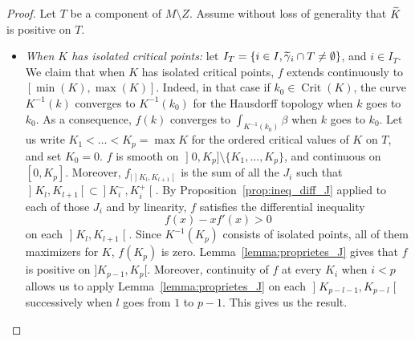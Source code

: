 \documentclass[10pt,a4paper]{amsart}
\DeclareMathOperator{\Crit}{Crit}
\let\oldtilde\tilde
\renewcommand*{\tilde}[1]{\mathchoice{\widetilde{#1}}{\widetilde{#1}}{\oldtilde{#1}}{\oldtilde{#1}}}
\theoremstyle{definition}\newtheorem{defi}[theo]{Definition}
\begin{document}
\begin{proof}
Let $T$ be a component of $M \setminus Z$. Assume without loss of generality that $\tilde K$ is positive on $T$.
\begin{itemize}
\item
\emph{When $K$ has isolated critical points: } let $I_T = \{i \in I, \tilde \gamma_i \cap T \neq \emptyset\}$, and $i \in I_T$. We claim that when $K$ has isolated critical points, $f$ extends continuously to $[\min(K), \max(K)]$. Indeed, in that case if $k_0 \in \Crit(K)$, the curve $K^{-1}(k)$ converges to $K^{-1}(k_0)$ for the Hausdorff topology when $k$ goes to $k_0$. As a consequence, $f(k)$ converges to $\int_{K^{-1}(k_0)} \beta$ when $k$ goes to $k_0$. Let us write $K_1 < \dots < K_p = \max K$ for the ordered critical values of $K$ on $T$, and set $K_0 = 0$. $f$ is smooth on $\mathopen{]}0, K_p] \setminus \{K_1, \ldots, K_p\}$, and continuous on $[0, K_p]$. Moreover, $f_{|\mathopen{]}K_l, K_{l+1}\mathclose{[}}$ is the sum of all the $J_i$ such that $\mathopen{]}K_l, K_{l+1}[\subset]K_i^-, K_i^+\mathclose{[}$. By Proposition~\ref{prop:ineq_diff_J} applied to each of those $J_i$ and by linearity, $f$ satisfies the differential inequality
\[
f(x) - x f'(x) > 0
\]
on each $\mathopen{]}K_l, K_{l+1}\mathclose{[}$. Since $K^{-1}(K_p)$ consists of isolated points, all of them maximizers for $K$, $f(K_p)$ is zero. Lemma~\ref{lemma:proprietes_J} gives that $f$ is positive on $]K_{p-1}, K_p[$. Moreover, continuity of $f$ at every $K_i$ when $i < p$ allows us to apply Lemma~\ref{lemma:proprietes_J} on each $\mathopen{]}K_{p-l-1}, K_{p-l}\mathclose{[}$ successively when $l$ goes from $1$ to $p-1$. This gives us the result.


\end{itemize}
\end{proof}
\end{document}
